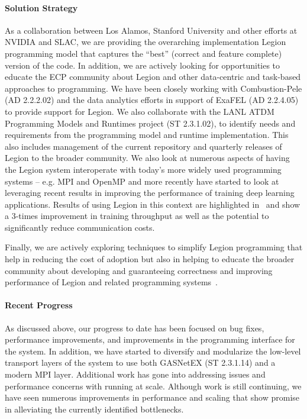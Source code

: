 \paragraph{Solution Strategy}
As a collaboration between Los Alamos, Stanford University and other
efforts at NVIDIA and SLAC, we are providing the overarching
implementation Legion programming model that captures the ``best''
(correct and feature complete) version of the code.  In addition, we
are actively looking for opportunities to educate the ECP community
about Legion and other data-centric and task-based approaches to
programming.  We have been closely working with Combustion-Pele (AD
2.2.2.02) and the data analytics efforts in support of ExaFEL (AD
2.2.4.05) to provide support for Legion.  We also collaborate with the
LANL ATDM Programming Models and Runtimes project (ST 2.3.1.02), to
identify needs and requirements from the programming model and runtime
implementation.  This also includes management of the current
repository and quarterly releases of Legion to the broader community.
We also look at numerous aspects of having the Legion system
interoperate with today's more widely used programming systems --
e.g. MPI and OpenMP and more recently have started to look at
leveraging recent results in improving the performance of training
deep learning applications.  Results of using Legion in this context are
highlighted in~\cite{2.3.1.08:Jia:2018} and show a $3$-times improvement
in training throughput as well as the potential to significantly reduce
communication costs.  

Finally, we are actively exploring techniques to simplify Legion
programming that help in reducing the cost of adoption but also in
helping to educate the broader community about developing and
guaranteeing correctness and improving performance of Legion and
related programming systems~\cite{2.3.1.08:Lee:2018,
2.3.1.08:Lee:Correctness:2018}.

\paragraph{Recent Progress}
As discussed above, our progress to date has been focused on bug
fixes, performance improvements, and improvements in the programming
interface for the system.  In addition, we have started to diversify
and modularize the low-level transport layers of the system to use
both GASNetEX (ST 2.3.1.14) and a modern MPI layer. Additional work
has gone into addressing issues and performance concerns with running
at scale.  Although work is still continuing, we have seen numerous
improvements in performance and scaling that show promise in
alleviating the currently identified bottlenecks.

